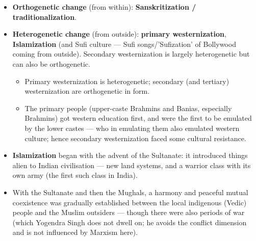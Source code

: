 \begin{itemize}
\item \textbf{Orthogenetic change} (from within): \textbf{Sanskritization / traditionalization}.
\item \textbf{Heterogenetic change} (from outside): \textbf{primary westernization}, \textbf{Islamization} (and Sufi culture --- Sufi songs/'Sufization' of Bollywood coming from outside). Secondary westernization is largely heterogenetic but can also be orthogenetic.
\begin{itemize}
\item Primary westernization is heterogenetic; secondary (and tertiary) westernization are orthogenetic in form.
\item The primary people (upper-caste Brahmins and Banias, especially Brahmins) got western education first, and were the first to be emulated by the lower castes --- who in emulating them also emulated western culture; hence secondary westernization faced some cultural resistance.
\end{itemize}
\end{itemize}

\begin{KeyConcept}
\begin{itemize}
\item \textbf{Islamization} began with the advent of the Sultanate: it introduced things alien to Indian civilisation --- new land systems, and a warrior class with its own army (the first such class in India).
\item With the Sultanate and then the Mughals, a harmony and peaceful mutual coexistence was gradually established between the local indigenous (Vedic) people and the Muslim outsiders --- though there were also periods of war (which Yogendra Singh does not dwell on; he avoids the conflict dimension and is not influenced by Marxism here).
\end{itemize}
\end{KeyConcept}

